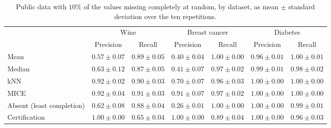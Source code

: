 \begin{table}[t]
\centering
\footnotesize
\setlength{\tabcolsep}{2.4pt}
\begin{tabular}{lcccccc}
\toprule
 & \multicolumn{2}{c}{Wine} & \multicolumn{2}{c}{Breast cancer} & \multicolumn{2}{c}{Diabetes}\\
\cmidrule(lr){2-3}\cmidrule(lr){4-5}\cmidrule(lr){6-7}
 & Precision & Recall & Precision & Recall & Precision & Recall\\
\midrule
Mean & $0.57\pm0.07$ & $0.89\pm0.05$ & $0.40\pm0.04$ & $1.00\pm0.00$ & $0.96\pm0.01$ & $1.00\pm0.01$\\
Median & $0.63\pm0.12$ & $0.87\pm0.05$ & $0.41\pm0.07$ & $0.97\pm0.02$ & $0.99\pm0.01$ & $0.98\pm0.02$\\
kNN & $0.92\pm0.02$ & $0.90\pm0.03$ & $0.70\pm0.07$ & $0.96\pm0.03$ & $1.00\pm0.00$ & $1.00\pm0.00$\\
MICE & $0.92\pm0.04$ & $0.91\pm0.03$ & $0.91\pm0.07$ & $0.97\pm0.02$ & $1.00\pm0.00$ & $1.00\pm0.00$\\
\addlinespace[2pt]
Absent (least completion) & $0.62\pm0.08$ & $0.88\pm0.04$ & $0.26\pm0.01$ & $1.00\pm0.00$ & $1.00\pm0.00$ & $0.99\pm0.01$\\
Certification & $1.00\pm0.00$ & $0.65\pm0.04$ & $1.00\pm0.00$ & $0.89\pm0.04$ & $1.00\pm0.00$ & $0.96\pm0.03$\\
\bottomrule
\end{tabular}
\caption{Public data with $10\%$ of the values missing completely at random, by dataset, as mean $\pm$ standard deviation over the ten repetitions.}
\label{tab:results-datasets}
\end{table}
